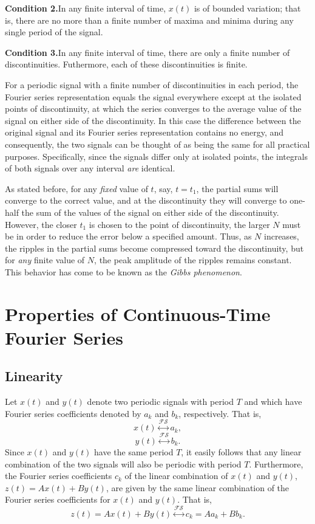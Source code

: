 \documentclass[a4paper,10pt,twoside]{book}
\begin{document}
\noindent\textbf{Condition 2.}\quad In any finite interval of time, $x(t)$ is of bounded variation; that is, there are no more than a finite number of maxima and minima during any single period of the signal.

\noindent\textbf{Condition 3.}\quad In any finite interval of time, there are only a finite number of discontinuities. Futhermore, each of these discontinuities is finite.

For a periodic signal with a finite number of discontinuities in each period, the Fourier series representation equals the signal everywhere except at the isolated points of discontinuity, at which the series converges to the average value of the signal on either side of the discontinuity. In this case the difference between the original signal and its Fourier series representation contains no energy, and consequently, the two signals can be thought of as being the same for all practical purposes. Specifically, since the signals differ only at isolated points, the integrals of both signals over any interval \textit{are} identical.

As stated before, for any \textit{fixed} value of $t$, say, $t=t_1$, the partial sums will converge to the correct value, and at the discontinuity they will converge to one-half the sum of the values of the signal on either side of the discontinuity. However, the closer $t_1$ is chosen to the point of discontinuity, the larger $N$ must be in order to reduce the error below a specified amount. Thus, as $N$ increases, the ripples in the partial sums become compressed toward the discontinuity, but for \textit{any} finite value of $N$, the peak amplitude of the ripples remains constant. This behavior has come to be known as the \textit{Gibbs phenomenon}.

\section{Properties of Continuous-Time Fourier Series}
\subsection{Linearity}

Let $x(t)$ and $y(t)$ denote two periodic signals with period $T$ and which have Fourier series coefficients denoted by $a_k$ and $b_k$, respectively. That is, $$x(t)\overset{\mathcal{FS}}{\longleftrightarrow}a_k,$$$$y(t)\overset{\mathcal{FS}}{\longleftrightarrow}b_k.$$ Since $x(t)$ and $y(t)$ have the same period $T$, it easily follows that any linear combination of the two signals will also be periodic with period $T$. Furthermore, the Fourier series coefficients $c_k$ of the linear combination of $x(t)$ and $y(t)$, $z(t)=Ax(t)+By(t)$, are given by the same linear combination of the Fourier series coefficients for $x(t)$ and $y(t)$. That is,
\begin{equation}
    z(t) = Ax(t)+By(t) \overset{\mathcal{FS}}{\longleftrightarrow} c_{k} = Aa_{k} + Bb_{k}.
    \label{3.58}
\end{equation}
\end{document}

